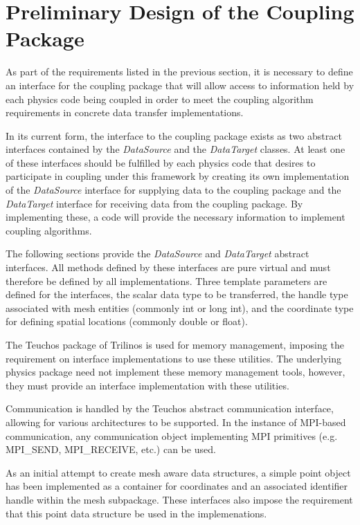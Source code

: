 \documentclass[letterpaper]{article}
\begin{document}
\section{Preliminary Design of the Coupling Package}
As part of the requirements listed in the previous section, it is
necessary to define an interface for the coupling package that will
allow access to information held by each physics code being coupled in
order to meet the coupling algorithm requirements in concrete data
transfer implementations.

In its current form, the interface to the coupling package exists as
two abstract interfaces contained by the {\sl DataSource} and the
{\sl DataTarget} classes. At least one of these interfaces should be
fulfilled by each physics code that desires to participate in coupling
under this framework by creating its own implementation of the {\sl
  DataSource} interface for supplying data to the coupling package
and the {\sl DataTarget} interface for receiving data from the
coupling package. By implementing these, a code will provide the
necessary information to implement coupling algorithms. 

The following sections provide the {\sl DataSource} and {\sl
  DataTarget} abstract interfaces. All methods defined by these
interfaces are pure virtual and must therefore be defined by all
implementations. Three template parameters are defined for the
interfaces, the scalar data type to be transferred, the handle type
associated with mesh entities (commonly int or long int), and the
coordinate type for defining spatial locations (commonly double or float).

The Teuchos package of Trilinos is used for memory management,
imposing the requirement on interface implementations to use these
utilities. The underlying physics package need not implement these
memory management tools, however, they must provide an interface
implementation with these utilities.

Communication is handled by the Teuchos abstract communication
interface, allowing for various architectures to be supported. In the
instance of MPI-based communication, any communication object
implementing MPI primitives (e.g. MPI\_SEND, MPI\_RECEIVE, etc.) can
be used. 

As an initial attempt to create mesh aware data structures, a simple
point object has been implemented as a container for coordinates and
an associated identifier handle within the mesh subpackage. These
interfaces also impose the requirement that this point data structure
be used in the implemenations.
\end{document}
